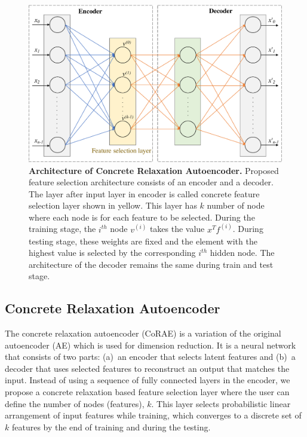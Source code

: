 \documentclass{bioinfo}
\begin{document}
\begin{figure}[h!]
    \centering
    \includegraphics[scale=0.5]{fig/architecture.pdf}
    \caption{\textbf{Architecture of Concrete Relaxation Autoencoder.} Proposed feature selection architecture consists of an encoder and a decoder. The layer after input layer in encoder is called concrete feature selection layer shown in yellow. This layer has $k$ number of node where each node is for each feature to be selected. During the training stage, the $i^{th}$ node $v^{(i)}$ takes the value $x^Tf^{(i)}$.
During testing stage, these weights are fixed and the element with the highest value is selected by the corresponding $i^{th}$ hidden node.
The architecture of the decoder remains the same during train and test stage.}
    \label{fig:architecture}
\end{figure}


\subsection{Concrete Relaxation Autoencoder} \label{CoRAE}
The concrete relaxation autoencoder (CoRAE) is a variation of the original autoencoder (AE) \citep{hinton2006reducing} which is used for dimension reduction. 
It is a neural network that consists of two parts: (a)~an encoder that selects latent features and (b)~a decoder that uses selected features to reconstruct an output that matches the input. 
Instead of using a sequence of fully connected layers in the encoder,  we propose a concrete relaxation based feature selection layer where the user can define the number of nodes (features), $k$. 
This layer selects probabilistic linear arrangement of input features while training, which converges to a discrete set of $k$ features by the end of training and during the testing. 
\end{document}

